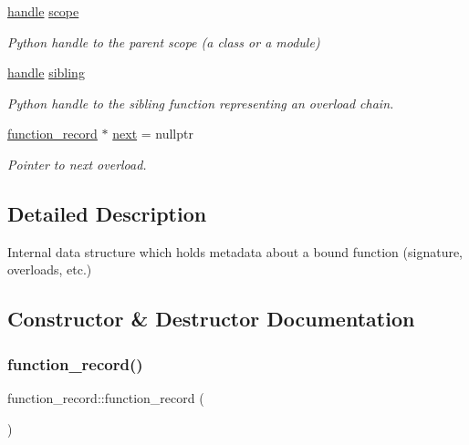 \begin{DoxyCompactItemize}
\mbox{\hyperlink{classhandle}{handle}} \mbox{\hyperlink{structfunction__record_ad4112e6eb003c64f181968b2759a08af}{scope}}
\begin{DoxyCompactList}\small\item\em Python handle to the parent scope (a class or a module) \end{DoxyCompactList}\item 
\mbox{\hyperlink{classhandle}{handle}} \mbox{\hyperlink{structfunction__record_a647a4421f0491047b6ea680efd2c0e45}{sibling}}
\begin{DoxyCompactList}\small\item\em Python handle to the sibling function representing an overload chain. \end{DoxyCompactList}\item 
\mbox{\hyperlink{structfunction__record}{function\+\_\+record}} $\ast$ \mbox{\hyperlink{structfunction__record_a141b30999d54286b04d06ad6180dbf99}{next}} = nullptr
\begin{DoxyCompactList}\small\item\em Pointer to next overload. \end{DoxyCompactList}\end{DoxyCompactItemize}


\subsection{Detailed Description}
Internal data structure which holds metadata about a bound function (signature, overloads, etc.) 

\subsection{Constructor \& Destructor Documentation}
\mbox{\label{structfunction__record_a29becdf2041f6b80b1f1531d22175ed9}} 
\subsubsection{\texorpdfstring{function\_record()}{function\_record()}}
{\footnotesize\ttfamily function\+\_\+record\+::function\+\_\+record (\begin{DoxyParamCaption}{ }\end{DoxyParamCaption})\hspace{0.3cm}{\ttfamily [inline]}}



